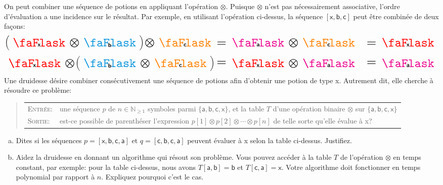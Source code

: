 \documentclass{article}
\newcommand{\N}{\mathbb{N}}                      %
\begin{document}
\begin{question}
  On peut combiner une séquence de potions en appliquant l'opération
  $\otimes$. Puisque $\otimes$ n'est pas nécessairement associative,
  l'ordre d'évaluation a une incidence sur le résultat. Par exemple,
  en utilisant l'opération ci-dessus, la séquence $[\textsf{x},
    \textsf{b}, \textsf{c}]$ peut être combinée de deux
  façons:\smallskip
  \begin{alignat*}{2}
  \left(\potionp{2.0}{red}{x} \bigotimes
  \potionp{2.0}{cyan!80!blue}{b}\right) \bigotimes
  \potionp{2.0}{orange}{c}\
  &\raisebox{-3pt}{\scalebox{2}{=}}\
  \potionp{2.0}{magenta}{a} \bigotimes
  \potionp{2.0}{orange}{c}\
  &\raisebox{-3pt}{\scalebox{2}{=}}\
  \potionp{2.0}{red}{x} \\[5pt]
  \potionp{2.0}{red}{x} \bigotimes
  \left(\potionp{2.0}{cyan!80!blue}{b} \bigotimes
  \potionp{2.0}{orange}{c}\right)\
  &\raisebox{-1pt}{\scalebox{2}{=}}\
  \potionp{2.0}{red}{x} \bigotimes
  \potionp{2.0}{magenta}{a}\
  &\raisebox{-1pt}{\scalebox{2}{=}}\
  \potionp{2.0}{magenta}{a}
  \end{alignat*}
  Une druidesse désire combiner consécutivement une séquence de potions
  afin d'obtenir une potion de type \textsf{x}. Autrement dit, elle
  cherche à résoudre ce problème:\medskip
  \begin{quote}
    \vspace*{5pt}
    \begin{tabular}{lp{10.25cm}}
      \textsc{Entrée}: & une séquence $p$ de $n \in \N_{\geq 1}$
      symboles parmi $\{\textsf{a}, \textsf{b}, \textsf{c},
      \textsf{x}\}$, et la table $T$ d'une opération binaire $\otimes$
      sur $\{\textsf{a}, \textsf{b}, \textsf{c}, \textsf{x}\}$ \\[5pt]
      
      \textsc{Sortie}: & est-ce possible de parenthéser l'expression
      $p[1] \otimes p[2] \otimes \cdots \otimes p[n]$ de telle sorte
      qu'elle évalue à \textsf{x}?
    \end{tabular}
    \vspace*{5pt}
  \end{quote}\bigskip

  \begin{enumerate}[(a)]
  \setlength\itemsep{30pt}
    
  \item Dites  si les séquences $p =
    [\textsf{x}, \textsf{b}, \textsf{c}, \textsf{a}]$ et $q =
    [\textsf{c}, \textsf{b}, \textsf{c}, \textsf{a}]$ peuvent évaluer
    à \textsf{x} selon la table
    ci-dessus. Justifiez.

  \item Aidez la  druidesse en donnant un
    algorithme qui résout son problème. Vous pouvez accéder à la table
    $T$ de l'opération $\otimes$ en temps constant, par exemple: pour
    la table ci-dessus, nous avons $T[\textsf{a}, \textsf{b}] =
    \textsf{b}$ et $T[\textsf{c}, \textsf{a}] = \textsf{x}$. Votre
    algorithme doit fonctionner en temps polynomial par rapport à
    $n$. Expliquez pourquoi c'est le cas.
  \end{enumerate}
\end{question}
\end{document}
